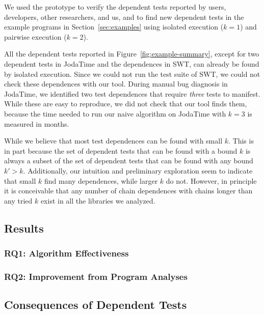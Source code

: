 
We used the prototype to verify the dependent tests reported by
users, developers, other researchers, and us, and to find new dependent
tests in the
example programs in Section~\ref{sec:examples} using isolated execution ($k = 1$)
and pairwise execution ($k = 2$).

All the dependent tests reported in Figure~\ref{fig:example-summary},
except for two dependent tests in JodaTime and the dependences in SWT, 
can already be found by isolated execution. Since we could not run the
test suite of SWT, we could not check these dependences with our tool.
During manual bug diagnosis in JodaTime, we identified two test dependences that require
\emph{three} tests to manifest. While these are easy to reproduce, we
did not check that our tool finds them, because the time needed to
run our naive algorithm on JodaTime with $k=3$ is measured in months.

While we believe that most test dependences can be found with small
$k$. This is in part because the set of dependent tests that can be
found with a bound $k$ is always a subset of the set of dependent
tests that can be found with any bound $k' > k$. Additionally, our
intuition and preliminary exploration seem to indicate that small $k$
find many dependences, while larger $k$ do not. However, in principle
it is conceivable
that any number of chain dependences with chains longer than any tried $k$ exist
in all the libraries we analyzed.

\subsection{Results}


\subsubsection{RQ1: Algorithm Effectiveness}

\subsubsection{RQ2: Improvement from Program Analyses}

\subsection{Consequences of Dependent Tests}

